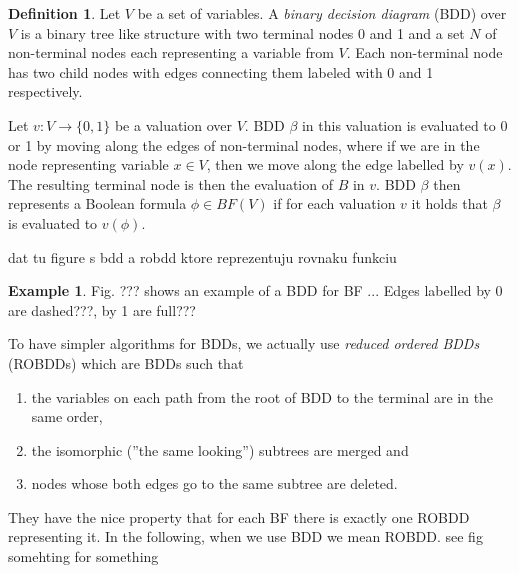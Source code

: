 \documentclass[
  digital, %
  twoside, %
  table,   %
  nolof,     %
  nolot,     %
]{fithesis3}
\theoremstyle{definition}
\newtheorem{definition}{Definition}
\newtheorem{example}{Example}
\theoremstyle{remark}
\newcommand{\BF}[1]{BF(#1)}
\begin{document}
\begin{definition}
  Let $V$ be a set of variables. A \emph{binary decision diagram} (BDD) over $V$ is a binary tree like structure with two terminal nodes 0 and 1 and a set $N$ of non-terminal nodes each representing a variable from $V$. Each non-terminal node has two child nodes with edges connecting them labeled with 0 and 1 respectively.
\end{definition}


Let $v\colon V \to \{0,1\}$ be a valuation over $V$. BDD $\beta$ in this valuation is evaluated to 0 or 1 by moving along the edges of non-terminal nodes, where if we are in the node representing variable $x \in V$, then we move along the edge labelled by $v(x)$. The resulting terminal node is then the evaluation of $B$ in $v$. BDD $\beta$ then represents a Boolean formula $\phi \in \BF{V}$ if for each valuation $v$ it holds that $\beta$ is evaluated to $v(\phi)$.

dat tu figure s bdd a robdd ktore reprezentuju rovnaku funkciu

\begin{example}
Fig. ??? shows an example of a BDD for BF ... Edges labelled by 0 are dashed???, by 1 are full??? 
\end{example}

To have simpler algorithms for BDDs, we actually use \emph{reduced ordered BDDs} (ROBDDs) which are BDDs such that 
\begin{enumerate}
    \item the variables on each path from the root of BDD to the terminal are in the same order,
    \item the isomorphic (''the same looking'') subtrees are merged and
    \item nodes whose both edges go to the same subtree are deleted.
\end{enumerate}
They have the nice property that for each BF there is exactly one ROBDD representing it. In the following, when we use BDD we mean ROBDD. see fig somehting for something

\end{document}
